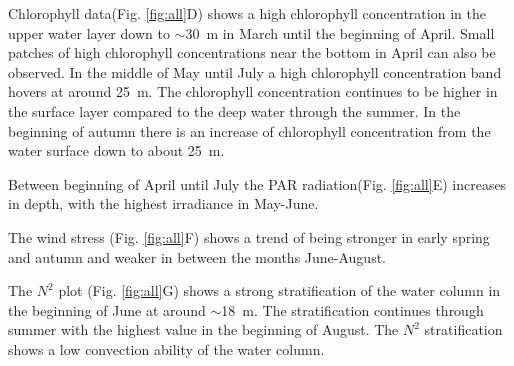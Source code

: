 \documentclass[../Main.tex]{subfiles}
\begin{document}
Chlorophyll data(Fig. \ref{fig:all}D) shows a high chlorophyll concentration in the upper water layer down to $\sim$\SI{30}{\metre} in March until the beginning of April. Small patches of high chlorophyll concentrations near the bottom in April can also be observed. 
In the middle of May until July a high chlorophyll concentration band hovers at around \SI{25}{m}. The chlorophyll concentration continues to be higher in the surface layer compared to the deep water through the summer. In the beginning of autumn there is an increase of chlorophyll concentration from the water surface down to about \SI{25}{m}.

Between beginning of April until July the PAR radiation(Fig. \ref{fig:all}E) increases in depth, with the highest irradiance in May-June.

The wind stress (Fig. \ref{fig:all}F) shows a trend of being stronger in early spring and autumn and weaker in between the months June-August.

The $N^2$ plot (Fig. \ref{fig:all}G) shows a strong stratification of the water column in the beginning of June at around  $\sim$\SI{18}{\metre}. The stratification continues through summer with the highest value in the beginning of August. The $N^2$ stratification shows a low convection ability of the water column. 
\end{document}
